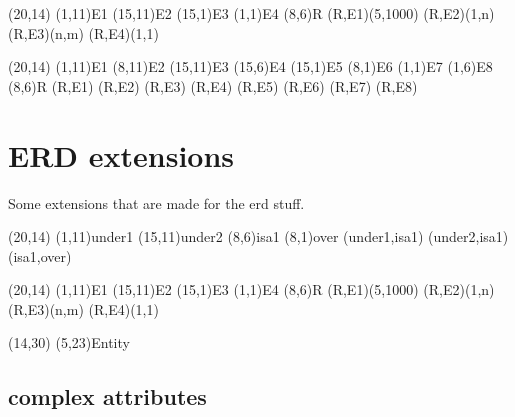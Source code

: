 \documentclass[a4paper,11pt]{article}
\begin{document}
\begin{schema}(20,14)
  \entity(1,11){E1}
  \entity(15,11){E2}
  \entity(15,1){E3}
  \entity(1,1){E4}
  \relation(8,6){R}
  \conn(R,E1){(5,1000)}
  \conn(R,E2){(1,n)}
  \conn(R,E3){(n,m)}
  \conn(R,E4){(1,1)}
\end{schema}

\begin{schema}(20,14)
  \entity(1,11){E1}
  \entity(8,11){E2}
  \entity(15,11){E3}
  \entity(15,6){E4}
  \entity(15,1){E5}
  \entity(8,1){E6}
  \entity(1,1){E7}
  \entity(1,6){E8}
  \relation(8,6){R}
  \conn(R,E1){}
  \conn(R,E2){}
  \conn(R,E3){}
  \conn(R,E4){}
  \conn(R,E5){}
  \conn(R,E6){}
  \conn(R,E7){}
  \conn(R,E8){}
\end{schema}

\section{ERD extensions}

Some extensions that are made for the erd stuff.

\begin{schema}(20,14)
  \entity(1,11){under1}
  \entity(15,11){under2}
  \isa(8,6){isa1}
  \entity(8,1){over}
  \conn(under1,isa1){}
  \conn(under2,isa1){}
  \conn(isa1,over){}
\end{schema}

\begin{schema}(20,14)
  \wentity(1,11){E1}
  \entity(15,11){E2}
  \entity(15,1){E3}
  \entity(1,1){E4}
  \wrelation(8,6){R}
  \conn(R,E1){(5,1000)}
  \conn(R,E2){(1,n)}
  \conn(R,E3){(n,m)}
  \conn(R,E4){(1,1)}
\end{schema}

\begin{schema}(14,30)
  \entity[entity](5,23){Entity}
\end{schema}

\subsection{complex attributes}
\end{document}
